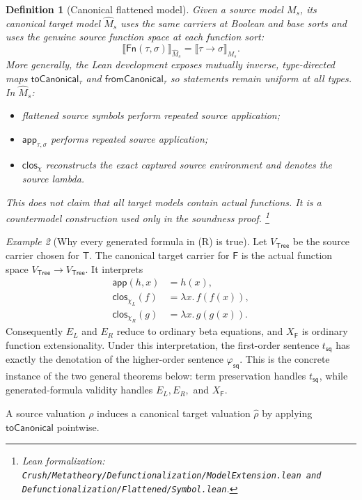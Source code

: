 \documentclass[11pt]{article}
\newtheorem{definition}{Definition}[section]
\theoremstyle{remark}
\newtheorem{example}[definition]{Example}
\newcommand{\leanfiles}[1]{\footnote{Lean formalization: \texttt{Crush/Metatheory/#1}.}}
\newcommand{\Fn}{\mathsf{Fn}}
\newcommand{\clos}{\mathsf{clos}}
\newcommand{\app}{\mathsf{app}}
\newcommand{\Tree}{\mathsf{Tree}}
\newcommand{\TreeTy}{\mathsf{T}}
\newcommand{\TreeFun}{\mathsf{F}}
\begin{document}
\begin{definition}[Canonical flattened model]
Given a source model $M_s$, its canonical target model $\widehat M_s$ uses the
same carriers at Boolean and base sorts and uses the genuine source function
space at each function sort:
\[
 \llbracket\Fn(\tau,\sigma)\rrbracket_{\widehat M_s}
 =\llbracket\tau\to\sigma\rrbracket_{M_s}.
\]
More generally, the Lean development exposes mutually inverse, type-directed
maps $\mathsf{toCanonical}_\tau$ and $\mathsf{fromCanonical}_\tau$ so statements
remain uniform at all types. In $\widehat M_s$:
\begin{itemize}[leftmargin=*]
 \item flattened source symbols perform repeated source application;
 \item $\app_{\tau,\sigma}$ performs repeated source application;
 \item $\clos_\chi$ reconstructs the exact captured source environment and
       denotes the source lambda.
\end{itemize}
This does not claim that all target models contain actual functions. It is a
countermodel construction used only in the soundness proof.
\leanfiles{Defunctionalization/ModelExtension.lean and Defunctionalization/Flattened/Symbol.lean}
\end{definition}

\begin{example}[Why every generated formula in (R) is true]
Let $V_{\Tree}$ be the source carrier chosen for $\TreeTy$. The canonical
target carrier for $\TreeFun$ is the actual function space
$V_{\Tree}\to V_{\Tree}$. It interprets
\[
\begin{aligned}
 \app(h,x)&=h(x),\\
 \clos_{\chi_L}(f)&=\lambda x.\,f(f(x)),\\
 \clos_{\chi_R}(g)&=\lambda x.\,g(g(x)).
\end{aligned}
\]
Consequently $E_L$ and $E_R$ reduce to ordinary beta equations, and
$X_{\TreeFun}$ is ordinary function extensionality. Under this interpretation,
the first-order sentence $t_{\mathsf{sq}}$ has exactly the denotation of the
higher-order sentence $\varphi_{\mathsf{sq}}$. This is the concrete instance
of the two general theorems below: term preservation handles
$t_{\mathsf{sq}}$, while generated-formula validity handles
$E_L,E_R,$ and $X_{\TreeFun}$.
\end{example}

A source valuation $\rho$ induces a canonical target valuation
$\widehat\rho$ by applying $\mathsf{toCanonical}$ pointwise.
\end{document}
